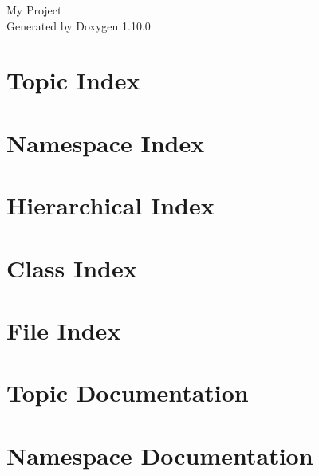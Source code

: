 \documentclass[twoside]{book}
\newcommand{\+}{\discretionary{\mbox{\scriptsize$\hookleftarrow$}}{}{}}
\newcommand{\clearemptydoublepage}{%
    \newpage{\pagestyle{empty}\cleardoublepage}%
  }
\begin{document}
  \raggedbottom
    \hypersetup{pageanchor=false,
                bookmarksnumbered=true,
                pdfencoding=unicode
               }
  \begin{titlepage}
  \vspace*{7cm}
  \begin{center}%
  {\Large My Project}\\
  \vspace*{1cm}
  {\large Generated by Doxygen 1.10.0}\\
  \end{center}
  \end{titlepage}
  \clearemptydoublepage
  \tableofcontents
  \clearemptydoublepage
  \hypersetup{pageanchor=true}
\chapter{Topic Index}

\chapter{Namespace Index}

\chapter{Hierarchical Index}

\chapter{Class Index}

\chapter{File Index}

\chapter{Topic Documentation}


\chapter{Namespace Documentation}

\end{document}
